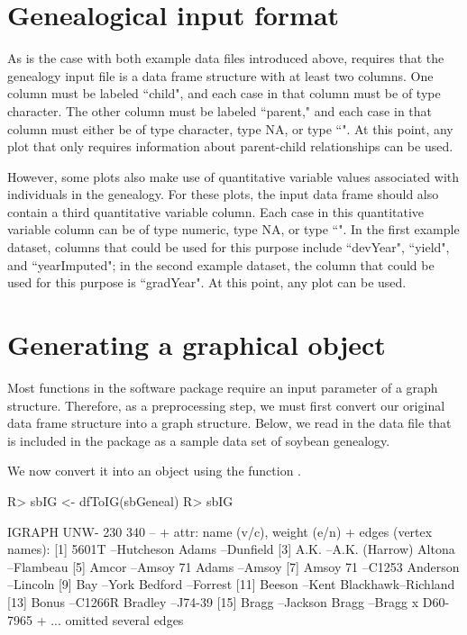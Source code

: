 \documentclass[article,shortnames]{jss}
\begin{document}
\section{Genealogical input format}

As is the case with both example data files introduced above,  requires that the genealogy input file is a data frame structure with at least two columns. One column must be labeled ``child", and each case in that column must be of type character. The other column must be labeled ``parent," and each case in that column must either be of type character, type NA, or type ``". At this point, any  plot that only requires information about parent-child relationships can be used.

However, some  plots also make use of quantitative variable values associated with individuals in the genealogy. For these plots, the input data frame should also contain a third quantitative variable column. Each case in this quantitative variable column can be of type numeric, type NA, or type ``". In the first example dataset, columns that could be used for this purpose include ``devYear", ``yield", and ``yearImputed"; in the second example dataset, the column that could be used for this purpose is ``gradYear". At this point, any  plot can be used.

\section{Generating a graphical object}
\label{ggo}

Most functions in the  software package require an input parameter of a graph structure. Therefore, as a preprocessing step, we must first convert our original data frame structure into a graph structure. Below, we read in the  data file  that is included in the package as a sample data set of soybean genealogy.

We now convert it into an  object  using the function 
.
\begin{CodeChunk}
\begin{CodeInput}
R> sbIG <- dfToIG(sbGeneal)
R> sbIG
\end{CodeInput}
\begin{CodeOutput}
IGRAPH UNW- 230 340 -- 
+ attr: name (v/c), weight (e/n)
+ edges (vertex names):
 [1] 5601T    --Hutcheson        Adams    --Dunfield        
 [3] A.K.     --A.K. (Harrow)    Altona   --Flambeau        
 [5] Amcor    --Amsoy 71         Adams    --Amsoy           
 [7] Amsoy 71 --C1253            Anderson --Lincoln         
 [9] Bay      --York             Bedford  --Forrest         
[11] Beeson   --Kent             Blackhawk--Richland        
[13] Bonus    --C1266R           Bradley  --J74-39          
[15] Bragg    --Jackson          Bragg    --Bragg x D60-7965
+ ... omitted several edges
\end{CodeOutput}
\end{CodeChunk}
\end{document}
